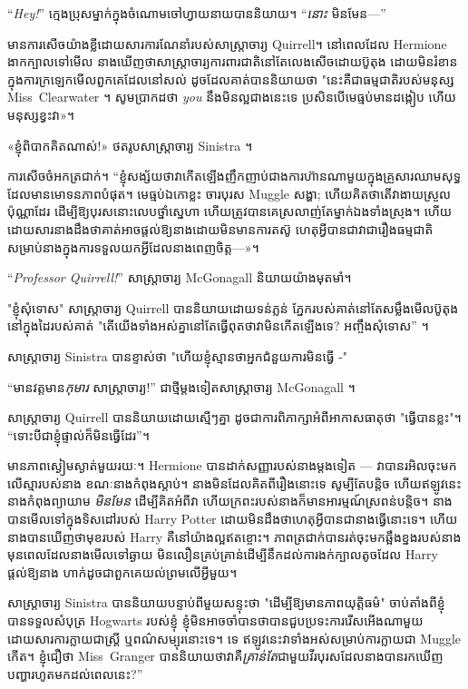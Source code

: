 “\emph{Hey!}” ក្មេងប្រុសម្នាក់ក្នុងចំណោមចៅហ្វាយនាយបាននិយាយ។ “\emph{នោះ} មិនមែន—”

មាន​ការ​សើច​យ៉ាង​ខ្លី​ដោយ​សារ​ការ​ណែនាំ​របស់​សាស្ត្រាចារ្យ Quirrell។ នៅពេលដែល Hermione ងាកក្បាលទៅមើល នាងឃើញថាសាស្ត្រាចារ្យការពារជាតិនៅតែលេងសើចដោយប៊ូតុង ដោយមិនរំខានក្នុងការក្រឡេកមើលពួកគេដែលនៅសល់ ដូចដែលគាត់បាននិយាយថា "នេះគឺជាធម្មជាតិរបស់មនុស្ស Miss~Clearwater ។ សូម​ប្រាកដ​ថា \emph{you} នឹង​មិន​ល្អ​ជាង​នេះ​ទេ ប្រសិនបើ​មេធ្មប់​មាន​ដង្កៀប ហើយ​មនុស្ស​ខ្វះ​វា»។

«ខ្ញុំ​ពិបាក​គិត​ណាស់!» ថត​រូប​សាស្ត្រាចារ្យ Sinistra ។

ការសើចចំអកត្រជាក់។ “ខ្ញុំ​សង្ស័យ​ថា​វា​កើត​ឡើង​ញឹកញាប់​ជាង​ការ​ហ៊ាន​ណា​មួយ​ក្នុង​គ្រួសារ​ឈាម​សុទ្ធ​ដែល​មាន​មោទនភាព​បំផុត។ មេធ្មប់ឯកោខ្លះ ចារបុរស Muggle សង្ហា; ហើយ​គិត​ថា​តើ​វា​ងាយ​ស្រួល​ប៉ុណ្ណា​ដែរ ដើម្បី​ឱ្យ​បុរស​នោះ​លេបថ្នាំ​ស្នេហា ហើយ​ត្រូវ​បាន​គេ​ស្រលាញ់​តែ​ម្នាក់​ឯង​ទាំង​ស្រុង។ ហើយ​ដោយ​សារ​នាង​ដឹង​ថា​គាត់​អាច​ផ្តល់​ឱ្យ​នាង​ដោយ​មិន​មាន​ការ​តស៊ូ ហេតុ​អ្វី​បាន​ជា​វា​ជា​រឿង​ធម្ម​ជាតិ​សម្រាប់​នាង​ក្នុង​ការ​ទទួល​យក​អ្វី​ដែល​នាង​ពេញ​ចិត្ត—»។

“\emph{Professor Quirrell!}” សាស្ត្រាចារ្យ McGonagall និយាយយ៉ាងមុតមាំ។

"ខ្ញុំសុំទោស" សាស្រ្តាចារ្យ Quirrell បាននិយាយដោយទន់ភ្លន់ ភ្នែករបស់គាត់នៅតែសម្លឹងមើលប៊ូតុងនៅក្នុងដៃរបស់គាត់ "តើយើងទាំងអស់គ្នានៅតែធ្វើពុតថាវាមិនកើតឡើងទេ? អញ្ចឹងសុំទោស” ។

សាស្រ្តាចារ្យ Sinistra បានខ្ទាស់ថា "ហើយខ្ញុំស្មានថាអ្នកជំនួយការមិនធ្វើ -"

“មានវត្តមាន\emph{កុមារ} សាស្រ្តាចារ្យ!” ជាថ្មីម្តងទៀតសាស្រ្តាចារ្យ McGonagall ។

សាស្ត្រាចារ្យ Quirrell បាននិយាយដោយស្មើៗគ្នា ដូចជាការពិភាក្សាអំពីអាកាសធាតុថា "ធ្វើបានខ្លះ"។ “ទោះបី​ជា​ខ្ញុំ​ផ្ទាល់​ក៏​មិន​ធ្វើ​ដែរ”។

មាន​ភាព​ស្ងៀម​ស្ងាត់​មួយ​រយៈ។ Hermione បាន​ដាក់​សញ្ញា​របស់​នាង​ម្តង​ទៀត — វា​បាន​រអិល​ចុះ​មក​លើ​ស្មា​របស់​នាង ខណៈ​នាង​កំពុង​ស្តាប់។ នាងមិនដែលគិតពីរឿងនោះទេ សូម្បីតែបន្តិច ហើយឥឡូវនេះនាងកំពុងព្យាយាម \emph{មិនមែន} ដើម្បីគិតអំពីវា ហើយក្រពះរបស់នាងក៏មានអារម្មណ៍ស្រពន់បន្តិច។ នាងបានមើលទៅក្នុងទិសដៅរបស់ Harry Potter ដោយមិនដឹងថាហេតុអ្វីបានជានាងធ្វើនោះទេ។ ហើយ​នាង​បាន​ឃើញ​ថា​មុខ​របស់ Harry គឺ​នៅ​យ៉ាង​ល្អ​ឥត​ខ្ចោះ។ ភាពត្រជាក់បានរត់ចុះមកឆ្អឹងខ្នងរបស់នាង មុនពេលដែលនាងមើលទៅឆ្ងាយ មិនលឿនគ្រប់គ្រាន់ដើម្បីនឹកដល់ការងក់ក្បាលតូចដែល Harry ផ្តល់ឱ្យនាង ហាក់ដូចជាពួកគេយល់ព្រមលើអ្វីមួយ។

សាស្ត្រាចារ្យ Sinistra បាននិយាយបន្ទាប់ពីមួយសន្ទុះថា "ដើម្បីឱ្យមានភាពយុត្តិធម៌" ចាប់តាំងពីខ្ញុំបានទទួលសំបុត្រ Hogwarts របស់ខ្ញុំ ខ្ញុំមិនអាចចាំបានថាបានជួបប្រទះការរើសអើងណាមួយដោយសារការក្លាយជាស្ត្រី ឬពណ៌សម្បុរនោះទេ។ ទេ ឥឡូវនេះវាទាំងអស់សម្រាប់ការក្លាយជា Muggle កើត។ ខ្ញុំជឿថា Miss~Granger បាននិយាយថាវាគឺ\emph{គ្រាន់តែ}ជាមួយវីរបុរសដែលនាងបានរកឃើញបញ្ហារហូតមកដល់ពេលនេះ?”

